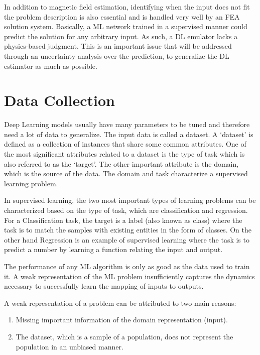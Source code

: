 In addition to magnetic field estimation, identifying when the input does not fit the problem description is also essential and is handled very well by an FEA solution system. Basically, a ML network trained in a supervised manner could predict the solution for any arbitrary input. As such, a DL emulator lacks a physics-based judgment. This is an important issue that will be addressed through an uncertainty analysis over the prediction, to generalize the DL estimator as much as possible.

\section{Data Collection} \label{sec:CNN_DataCollection}

Deep Learning models usually have many parameters to be tuned and therefore need a lot of data to generalize. The input data is called a dataset.
A `dataset' is defined as a collection of instances that share some common attributes. One of the most significant attributes related to a dataset is the type of task which is also referred to as the `target'. The other important attribute is the domain, which is the source of the data. The domain and task characterize a supervised learning problem.

In supervised learning, the two most important types of learning problems can be characterized based on the type of task, which are classification and regression. For a Classification task, the target is a label (also known as class) where the task is to match the samples with existing entities in the form of classes. On the other hand Regression is an example of supervised learning where the task is to predict a number by learning a function relating the input and output.

The performance of any ML algorithm is only as good as the data used to train it. A weak representation of the ML problem insufficiently captures the dynamics necessary to successfully learn the mapping of inputs to outputs. 

A weak representation of a problem can be attributed to two main reasons:

\begin{enumerate}
    \item Missing important information of the domain representation (input).
    
    \item The dataset, which is a sample of a population, does not represent the population in an unbiased manner. 
\end{enumerate}

